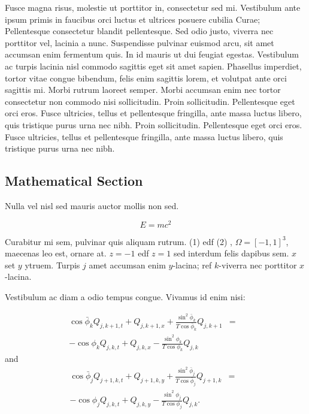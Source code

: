\documentclass[a0,landscape]{a0poster}
\begin{document}
\begin{multicols}{4}
Fusce magna risus, molestie ut porttitor in, consectetur sed mi. Vestibulum ante ipsum primis in faucibus orci luctus et ultrices posuere cubilia Curae; Pellentesque consectetur blandit pellentesque. Sed odio justo, viverra nec porttitor vel, lacinia a nunc. Suspendisse pulvinar euismod arcu, sit amet accumsan enim fermentum quis. In id mauris ut dui feugiat egestas. Vestibulum ac turpis lacinia nisl commodo sagittis eget sit amet sapien. Phasellus imperdiet, tortor vitae congue bibendum, felis enim sagittis lorem, et volutpat ante orci sagittis mi. Morbi rutrum laoreet semper. Morbi accumsan enim nec tortor consectetur non commodo nisi sollicitudin. Proin sollicitudin. Pellentesque eget orci eros. Fusce ultricies, tellus et pellentesque fringilla, ante massa luctus libero, quis tristique purus urna nec nibh. Proin sollicitudin. Pellentesque eget orci eros. Fusce ultricies, tellus et pellentesque fringilla, ante massa luctus libero, quis tristique purus urna nec nibh.


\subsection*{Mathematical Section}

Nulla vel nisl sed mauris auctor mollis non sed. 

\begin{equation}
E = mc^{2}
\label{eqn:Einstein}
\end{equation}

Curabitur mi sem, pulvinar quis aliquam rutrum. (1) edf (2)
, $\Omega=[-1,1]^3$, maecenas leo est, ornare at. $z=-1$ edf $z=1$ sed interdum felis dapibus sem. $x$ set $y$ ytruem. 
Turpis $j$ amet accumsan enim $y$-lacina; 
ref $k$-viverra nec porttitor $x$-lacina. 

Vestibulum ac diam a odio tempus congue. Vivamus id enim nisi:

\begin{eqnarray}
\cos\bar{\phi}_k Q_{j,k+1,t} + Q_{j,k+1,x}+\frac{\sin^2\bar{\phi}_k}{T\cos\bar{\phi}_k} Q_{j,k+1} &=&\nonumber\\ 
-\cos\phi_k Q_{j,k,t} + Q_{j,k,x}-\frac{\sin^2\phi_k}{T\cos\phi_k} Q_{j,k}\label{edgek}
\end{eqnarray}
and
\begin{eqnarray}
\cos\bar{\phi}_j Q_{j+1,k,t} + Q_{j+1,k,y}+\frac{\sin^2\bar{\phi}_j}{T\cos\bar{\phi}_j} Q_{j+1,k}&=&\nonumber \\
-\cos\phi_j Q_{j,k,t} + Q_{j,k,y}-\frac{\sin^2\phi_j}{T\cos\phi_j} Q_{j,k}.\label{edgej}
\end{eqnarray} 


\end{multicols}
\end{document}
